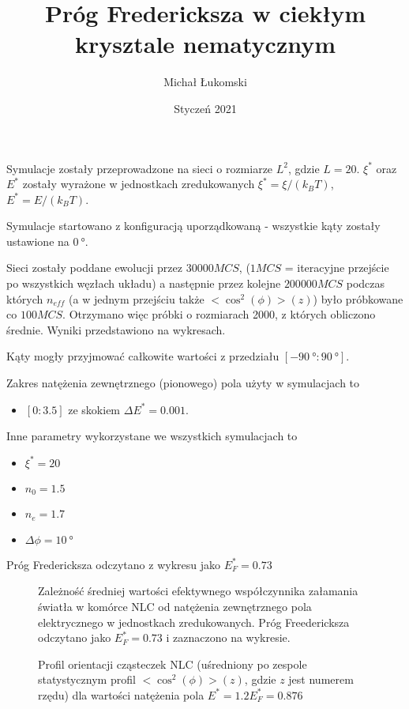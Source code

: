 \documentclass[11pt]{article}
\title{Próg Fredericksza w ciekłym krysztale nematycznym}
\author{Michał Łukomski}
\date{Styczeń 2021}
\begin{document}
    \maketitle

    Symulacje zostały przeprowadzone na sieci o rozmiarze $L^2$, gdzie $L=20$. 
    $\xi^*$ oraz $E^*$ zostały wyrażone w jednostkach zredukowanych $\xi^* = \xi / (k_B T)$, $E^* = E / (k_B T)$.
    
    Symulacje startowano z konfiguracją uporządkowaną - wszystkie kąty zostały ustawione na $\SI{0}{\degree}$.

    Sieci zostały poddane ewolucji przez $30 000 MCS$, ($1MCS$ = iteracyjne przejście po wszystkich węzłach układu) a następnie przez kolejne $200 000 MCS$ podczas których $n_{eff}$ (a w jednym przejściu także $<\cos^2(\phi)>(z)$) było próbkowane co $100 MCS$. Otrzymano więc próbki o rozmiarach 2000, z których obliczono średnie.
    Wyniki przedstawiono na wykresach. 

    Kąty mogły przyjmować całkowite wartości z przedziału $[\SI{-90}{\degree} : \SI{90}{\degree}]$.

    Zakres natężenia zewnętrznego (pionowego) pola użyty w symulacjach to
    \begin{itemize}
        \item $[0 : 3.5]$ ze skokiem $\Delta E^* = 0.001$.
    \end{itemize}

    Inne parametry wykorzystane we wszystkich symulacjach to
    \begin{itemize}
        \item $\xi^* = 20$
        \item $n_0 = 1.5$
        \item $n_e = 1.7$
        \item $\Delta \phi = \SI{10}{\degree}$
    \end{itemize}

    Próg Fredericksza odczytano z wykresu jako $E_F^* = 0.73$

\begin{figure}
    \centering
    
    \caption{Zależność średniej wartości efektywnego współczynnika załamania światła w komórce NLC od natężenia zewnętrznego pola elektrycznego w jednostkach zredukowanych. Próg Freedericksza odczytano jako $E_F^*=0.73$ i zaznaczono na wykresie.}
\end{figure}
\begin{figure}
    \centering
    
    \caption{Profil orientacji cząsteczek NLC (uśredniony po zespole statystycznym profil $<\cos^2(\phi)>(z)$, gdzie $z$ jest numerem rzędu) dla wartości natężenia pola $E^*=1.2 E_F^* = 0.876$}
\end{figure}
\newpage
\end{document}
